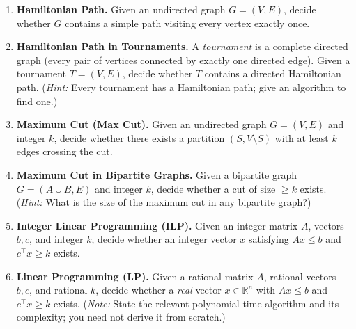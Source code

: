 \documentclass[9pt]{book}
\begin{document}
\begin{enumerate}[label=\arabic*.]
\item \textbf{Hamiltonian Path.}
Given an undirected graph $G=(V,E)$, decide whether $G$ 
contains a simple path visiting every vertex exactly once.

\bigskip

\item \textbf{Hamiltonian Path in Tournaments.}
A \emph{tournament} is a complete directed graph (every pair of vertices connected by 
exactly one directed edge).
Given a tournament $T=(V,E)$, decide whether $T$ contains a directed Hamiltonian path.
(\textit{Hint:} Every tournament has a Hamiltonian path; give an algorithm to find one.)

\bigskip

\item \textbf{Maximum Cut (Max Cut).}
Given an undirected graph $G=(V,E)$ and integer $k$, decide whether there 
exists a partition $(S,V\setminus S)$ with at least $k$ edges crossing the cut.

\bigskip

\item \textbf{Maximum Cut in Bipartite Graphs.}
Given a bipartite graph $G=(A\cup B,E)$ and integer $k$, decide whether a cut of 
size $\geq k$ exists.
(\textit{Hint:} What is the size of the maximum cut in any bipartite graph?)

\bigskip

\item \textbf{Integer Linear Programming (ILP).}
Given an integer matrix $A$, vectors $b,c$, and integer $k$, decide whether an 
integer vector $x$ satisfying $Ax\leq b$ and $c^\top x\geq k$ exists.

\bigskip

\item \textbf{Linear Programming (LP).}
Given a rational matrix $A$, rational vectors $b,c$, and rational $k$, decide whether 
a \emph{real} vector $x\in\mathbb{R}^n$ with $Ax\leq b$ and $c^\top x\geq k$ exists.
(\textit{Note:} State the relevant polynomial-time algorithm and its complexity; 
you need not derive it from scratch.)

\bigskip



\end{enumerate}
\end{document}
